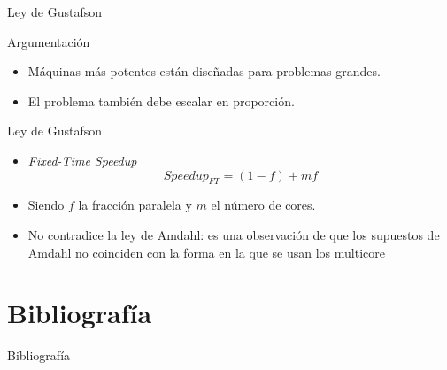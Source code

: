 \documentclass[utf8]{beamer}
\begin{document}
\begin{frame}{Ley de Gustafson}
    \begin{block}{Argumentación}
        \begin{itemize}
            \item Máquinas más potentes están diseñadas para problemas grandes.
            \item El problema también debe escalar en proporción.
        \end{itemize}
    \end{block}
    \begin{block}{Ley de Gustafson}
        \begin{itemize}
            \item \emph{Fixed-Time Speedup}
            $$ Speedup_{FT} = (1 - f) + mf $$
            \item Siendo $f$ la fracción paralela y $m$ el número de cores.
            \item No contradice la ley de Amdahl: es una observación de que los supuestos de Amdahl no coinciden con la forma en la que se usan los multicore
        \end{itemize}
    \end{block}
\end{frame}


\section{Bibliografía}

\begin{frame}[allowframebreaks]{Bibliografía}
    \nocite{*}
    
    
\end{frame}
\end{document}
